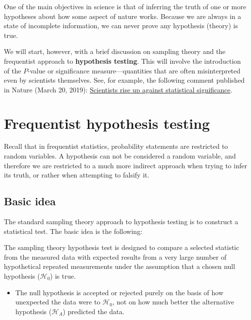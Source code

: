 \documentclass[%
oneside,                 %
final,                   %
10pt]{article}
\newenvironment{notice_mdfboxadmon}[1][]{
\begin{notice_mdfboxmdframed}[frametitle=#1]
}
{
\end{notice_mdfboxmdframed}
}
\begin{document}
One of the main objectives in science is that of inferring the truth of one or more hypotheses about how some aspect of nature works. Because we are always in a state of incomplete information, we can never prove any hypothesis (theory) is true.


We will start, however, with a brief discussion on sampling theory and the frequentist approach to \textbf{hypothesis testing}. This will involve the introduction of the $P$-value or significance measure---quantities that are often misinterpreted even by scientists themselves. See, for example, the following comment published in Nature (March 20, 2019): \href{{https://www.nature.com/articles/d41586-019-00857-9}}{Scientists rise up against statistical significance}.

\section{Frequentist hypothesis testing}
Recall that in frequentist statistics, probability statements are restricted to random variables. A hypothesis can not be considered a random variable, and therefore we are restricted to a much more indirect approach when trying to infer its truth, or rather when attempting to falsify it.

\subsection{Basic idea}

The standard sampling theory approach to hypothesis testing is to construct a statistical test. The basic idea is the following:


\begin{notice_mdfboxadmon}
The sampling theory hypothesis test is designed to compare a selected statistic from the measured data with expected results from a very large number of hypothetical repeated measurements under the assumption that a chosen null hypothesis ($\mathcal{H}_0$) is true.
\end{notice_mdfboxadmon} %



\begin{itemize}
\item The null hypothesis is accepted or rejected purely on the basis of how unexpected the data were to $\mathcal{H}_0$, not on how much better the alternative hypothesis ($\mathcal{H}_A$) predicted the data. 
\end{itemize}
\end{document}
